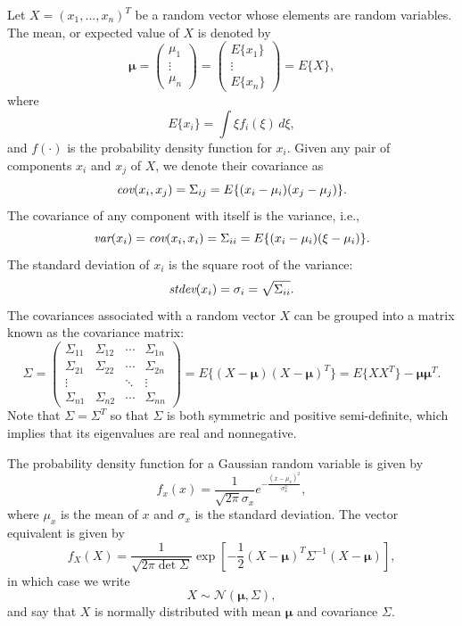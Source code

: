 {Let $X = (x_1, \dots, x_n)^T$ be a random vector whose elements are
random variables.  The mean, or expected value of $X$ is denoted by
\[
\boldsymbol{\mu} = \begin{pmatrix} \mu_1 \\ \vdots \\ \mu_n
\end{pmatrix}
= \begin{pmatrix} E\{x_1\} \\ \vdots \\ E\{x_n\} \end{pmatrix} =
E\{X\},
\]
where
\[
E\{x_i\} = \int \xi f_i(\xi) \,d\xi,
\]
and $f(\cdot)$ is the probability density function for $x_i$. Given
any pair of components $x_i$ and $x_j$ of $X$, we denote their
covariance as
\[
\text{\em cov}(x_i, x_j) = \Sigma_{ij} = E\{ (x_i-\mu_i)(x_j-\mu_j) \}.
\]
The covariance of any component with itself is the variance, i.e.,
\[
\text{\em var}(x_i) = \text{\em cov}(x_i,x_i) = \Sigma_{ii} = E\{ (x_i-\mu_i)(\xi-\mu_i)
\}.
\]
The standard deviation of $x_i$ is the square root of the variance:
\[
\text{\em stdev}(x_i) = \sigma_i = \sqrt{\Sigma_{ii}}.
\]
The covariances associated with a random vector $X$ can be grouped
into a matrix known as the covariance matrix:
\[
\Sigma = \begin{pmatrix}
    \Sigma_{11} & \Sigma_{12} & \cdots & \Sigma_{1n} \\
    \Sigma_{21} & \Sigma_{22} & \cdots & \Sigma_{2n} \\
    \vdots      &             & \ddots & \vdots      \\
    \Sigma_{n1} & \Sigma_{n2} & \cdots & \Sigma_{nn}
    \end{pmatrix}
    = E\{ (X-\boldsymbol{\mu})(X-\boldsymbol{\mu})^T \}
    = E\{ XX^T \} - \boldsymbol{\mu}\boldsymbol{\mu}^T.
\]
Note that $\Sigma = \Sigma^T$ so that $\Sigma$ is both symmetric and
positive semi-definite, which implies that its eigenvalues are real
and nonnegative.

The probability density function for a Gaussian random variable is
given by
\[
f_x(x) = \frac{1}{\sqrt{2\pi}\sigma_x}
e^{-\frac{(x-\mu_x)^2}{\sigma_x^2}},
\]
where $\mu_x$ is the mean of $x$ and $\sigma_x$ is the standard
deviation. The vector equivalent is given by
\[
f_X(X) = \frac{1}{\sqrt{2\pi\det{\Sigma}}} \exp \left[ -\frac{1}{2}
(X-\boldsymbol{\mu})^T \Sigma^{-1} (X-\boldsymbol{\mu}) \right],
\]
in which case we write
\[
X\sim \mathcal{N}\left(\boldsymbol{\mu}, \Sigma \right),
\]
and say that $X$ is normally distributed with mean
$\boldsymbol{\mu}$ and covariance $\Sigma$.

}
